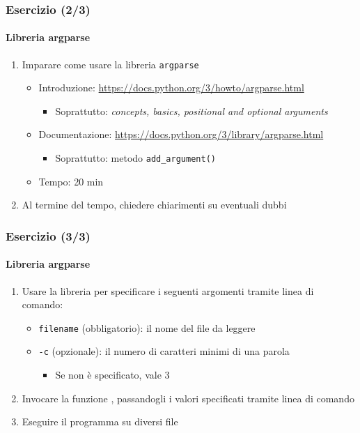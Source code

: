 \begin{exerciseframe}
    \frametitle{Esercizio (2/3)}
    \framesubtitle{Libreria argparse}

    \begin{enumerate}
        \item Imparare come usare la libreria \texttt{argparse}
        \begin{itemize}
            \item Introduzione: \url{https://docs.python.org/3/howto/argparse.html}
            \begin{itemize}
                \item Soprattutto: \textit{concepts, basics, positional and optional arguments}
            \end{itemize}
            \item Documentazione: \url{https://docs.python.org/3/library/argparse.html}
            \begin{itemize}
                \item Soprattutto: metodo \texttt{add\_argument()}
            \end{itemize}
            \item Tempo: 20 min
        \end{itemize}

        \bigskip
        \item Al termine del tempo, chiedere chiarimenti su eventuali dubbi
    \end{enumerate}
\end{exerciseframe}

\begin{exerciseframe}
    \frametitle{Esercizio (3/3)}
    \framesubtitle{Libreria argparse}

    \begin{enumerate}
        \item Usare la libreria per specificare i seguenti argomenti tramite linea di comando:
        \begin{itemize}
            \item \texttt{filename} (obbligatorio): il nome del file da leggere
            \item \texttt{-c} (opzionale): il numero di caratteri minimi di una parola
            \begin{itemize}
                \item Se non è specificato, vale 3
            \end{itemize}
        \end{itemize}

        \bigskip
        \item Invocare la funzione , passandogli i valori specificati tramite linea di comando

        \bigskip
        \item Eseguire il programma su diversi file
    \end{enumerate}
\end{exerciseframe}

